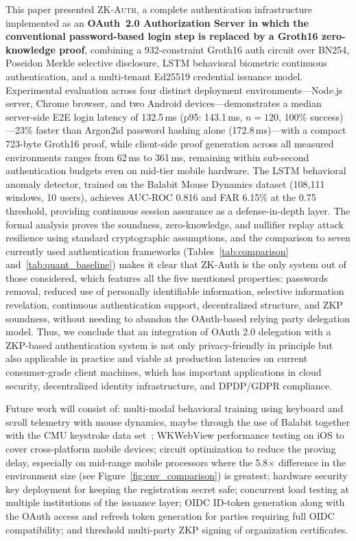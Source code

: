 \documentclass[journal,twoside,10pt]{IEEEtran}
\begin{document}
This paper presented \textsc{ZK-Auth}, a complete authentication
infrastructure implemented as an \textbf{OAuth~2.0 Authorization Server in
which the conventional password-based login step is replaced by a Groth16
zero-knowledge proof}, combining a 932-constraint Groth16 auth circuit over
BN254, Poseidon Merkle selective disclosure, LSTM behavioral biometric
continuous authentication, and a multi-tenant Ed25519 credential issuance
model. Experimental evaluation across four distinct deployment
environments---Node.js server, Chrome browser, and two Android
devices---demonstrates a median server-side E2E login latency of
132.5\,ms (p95: 143.1\,ms, $n=120$, 100\% success)---23\% faster than
Argon2id password hashing alone (172.8\,ms)---with a compact 723-byte
Groth16 proof, while client-side proof generation across all measured
environments ranges from 62\,ms to 361\,ms, remaining within sub-second
authentication budgets even on mid-tier mobile hardware. The LSTM
behavioral anomaly detector, trained on the Balabit Mouse Dynamics dataset
(108{,}111 windows, 10 users), achieves AUC-ROC 0.816 and FAR 6.15\% at the
0.75 threshold, providing continuous session assurance as a defense-in-depth
layer. The formal analysis proves the soundness, zero-knowledge, and
nullifier replay attack resilience using standard cryptographic assumptions,
and the comparison to seven currently used authentication frameworks
(Tables~\ref{tab:comparison} and~\ref{tab:quant_baseline}) makes it clear that
ZK-Auth is the only system out of those considered, which features all the
five mentioned properties: passwords removal, reduced use of personally
identifiable information, selective information revelation, continuous
authentication support, decentralized structure, and ZKP soundness, without
needing to abandon the OAuth-based relying party delegation model.
Thus, we conclude that an integration of OAuth 2.0 delegation with a
ZKP-based authentication system is not only privacy-friendly in principle but
also applicable in practice and viable at production latencies on current
consumer-grade client machines, which has important applications in cloud
security, decentralized identity infrastructure, and DPDP/GDPR compliance.

Future work will consist of: multi-modal behavioral training using keyboard and scroll telemetry with mouse dynamics, maybe through
the use of Balabit together with the CMU keystroke data set~\cite{killourhy09}; WKWebView performance testing on iOS
to cover cross-platform mobile devices; circuit optimization to reduce the proving delay, especially on mid-range mobile processors
where the 5.8$\times$ difference in the environment size (see Figure~\ref{fig:env_comparison}) is greatest; hardware security
key deployment for keeping the registration secret safe; concurrent load testing at multiple institutions of the issuance layer; OIDC
ID-token generation along with the OAuth access and refresh token generation for parties requiring full OIDC compatibility;
and threshold multi-party ZKP signing of organization certificates.
\end{document}
